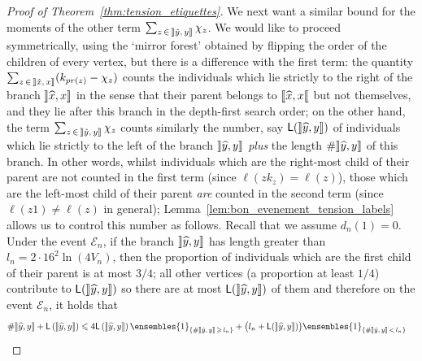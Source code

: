 \documentclass[10pt]{amsart}
\theoremstyle{definition}\newtheorem{defi}[theo]{Definition}\newtheorem{rema}[theo]{Remark}\newtheorem{exam}[theo]{Example}\newtheorem{exem}[theo]{Example}\newtheorem{nota}[theo]{Notation}
\newcommand{\llbracket}{\mathopen{[\mkern -2.7mu[}}
\newcommand{\rrbracket}{\mathclose{]\mkern -2.7mu]}}
\newcommand{\1}{\ensembles{1}}
\renewcommand{\le}{\leqslant}
\renewcommand{\ge}{\geqslant}
\newcommand{\LL}{\mathsf{L}}
\newcommand{\clE}{\mathcal{E}}
\newcommand{\vertices}{V}
\let\oldhat\hat
\renewcommand*{\hat}[1]{\mathchoice{\widehat{#1}}{\widehat{#1}}{\oldhat{#1}}{\oldhat{#1}}}
\providecommand{\?}{}
\begin{document}
\begin{proof}[Proof of Theorem~\ref{thm:tension_etiquettes}]
We next want a similar bound for the moments of the other term $\sum_{z\,\in\,\mathopen{\rrbracket} \hat{y},\, y \mathclose{\rrbracket}} \chi_{z}$. We would like to proceed symmetrically, using the `mirror forest' obtained by flipping the order of the children of every vertex, but there is a difference with the first term: the quantity $\sum_{z\,\in\,\mathopen{\rrbracket} \hat{x},\,x \mathclose{\rrbracket}} (k_{pr(z)}-\chi_{z})$ counts the individuals which lie strictly to the right of the branch $\mathopen{\rrbracket} \hat{x}, x \mathclose{\rrbracket}$ in the sense that their parent belongs to $\mathopen{\llbracket} \hat{x}, x \mathclose{\llbracket}$ but not themselves, and they lie after this branch in the depth-first search order; on the other hand, the term $\sum_{z\,\in\, \mathopen{\rrbracket} \hat{y},\,y \mathclose{\rrbracket}} \chi_{z}$ counts similarly the number, say $\LL(\mathopen{\rrbracket} \hat{y}, y \mathclose{\rrbracket})$ of individuals which lie strictly to the left of the branch $\mathopen{\rrbracket} \hat{y}, y \mathclose{\rrbracket}$ \emph{plus} the length $\# \mathopen{\rrbracket} \hat{y}, y \mathclose{\rrbracket}$ of this branch. In other words, whilst individuals which are the right-most child of their parent are not counted in the first term (since $\ell(zk_{z}) = \ell(z)$), those which are the left-most child of their parent \emph{are} counted in the second term (since $\ell(z1) \ne \ell(z)$ in general); Lemma~\ref{lem:bon_evenement_tension_labels} allows us to control this number as follows. Recall that we assume $d_{n}(1)=0$. Under the event $\clE_n$, if the branch $\mathopen{\rrbracket} \hat{y}, y \mathclose{\rrbracket}$ has length greater than $l_n = 2\cdot16^{2} \ln(4 \vertices_{n})$, then the proportion of individuals which are the first child of their parent is at most $3/4$; all other vertices (a proportion at least $1/4$) contribute to $\LL(\mathopen{\rrbracket} \hat{y}, y \mathclose{\rrbracket})$ so there are at most $\LL(\mathopen{\rrbracket} \hat{y}, y \mathclose{\rrbracket})$ of them and therefore on the event $\clE_n$, it holds that
\begin{align*}
\# \mathopen{\rrbracket} \hat{y}, y \mathclose{\rrbracket} + \LL\left(\mathopen{\rrbracket} \hat{y}, y \mathclose{\rrbracket}\right) &\le 4 \LL\left(\mathopen{\rrbracket} \hat{y}, y \mathclose{\rrbracket}\right) \1_{\left\{\# \mathopen{\rrbracket} \hat{y},\,y \mathclose{\rrbracket} \,\ge\,l_n\right\}} + \big(l_n + \LL(\mathopen{\rrbracket} \hat{y}, y \mathclose{\rrbracket})\big) \1_{\left\{\# \mathopen{\rrbracket} \hat{y},\,y \mathclose{\rrbracket} \,<\,l_n\right\}}

\end{align*}
\end{proof}
\end{document}
